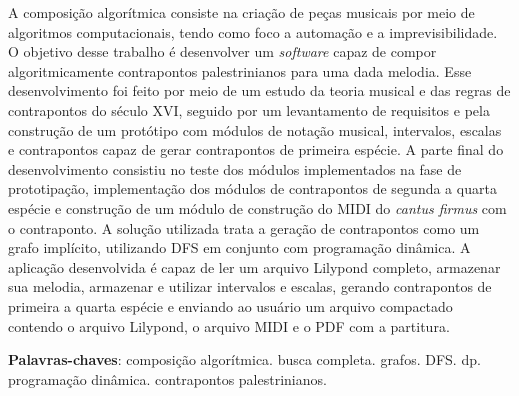 \begin{resumo}
 A composição algorítmica consiste na criação de peças musicais por meio de algoritmos computacionais, tendo como foco a automação e a imprevisibilidade. O objetivo desse trabalho é desenvolver um \textit{software} capaz de compor algoritmicamente contrapontos palestrinianos para uma dada melodia. Esse desenvolvimento foi feito por meio de um estudo da teoria musical e das regras de contrapontos do século XVI, seguido por um levantamento de requisitos e pela construção de um protótipo com módulos de notação musical, intervalos, escalas e contrapontos capaz de gerar contrapontos de primeira espécie. A parte final do desenvolvimento consistiu no teste dos módulos implementados na fase de prototipação, implementação dos módulos de contrapontos de segunda a quarta espécie e construção de um módulo de construção do MIDI do \textit{cantus firmus} com o contraponto. A solução utilizada trata a geração de contrapontos como um grafo implícito, utilizando DFS em conjunto com programação dinâmica. A aplicação desenvolvida é capaz de ler um arquivo Lilypond completo, armazenar sua melodia, armazenar e utilizar intervalos e escalas, gerando contrapontos de primeira a quarta espécie e enviando ao usuário um arquivo compactado contendo o arquivo Lilypond, o arquivo MIDI e o PDF com a partitura.

 \vspace{\onelineskip}

 \noindent
 \textbf{Palavras-chaves}: composição algorítmica. busca completa. grafos. DFS. dp. programação dinâmica. contrapontos palestrinianos.
\end{resumo}
